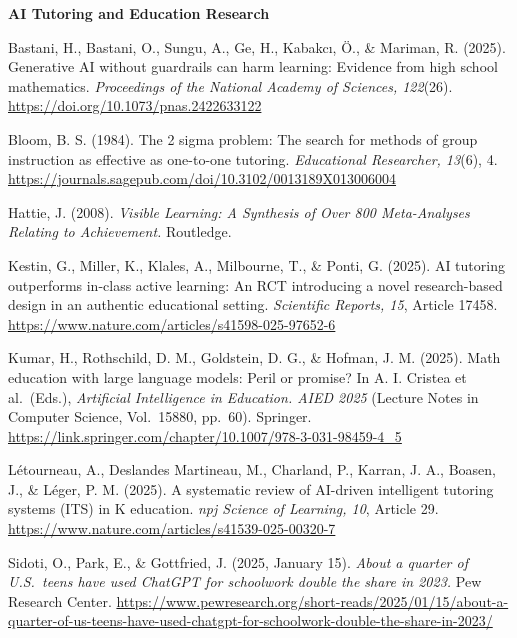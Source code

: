 \documentclass[11pt,letterpaper]{article}
\begin{document}
\vspace{0.3em}
{\sffamily\bfseries\small\color{accent}AI Tutoring and Education Research}\vspace{-0.2em}

\begin{list}{}{%
  \setlength{\leftmargin}{1.4em}
  \setlength{\itemindent}{-1.4em}
  \setlength{\itemsep}{0.35em}
  \setlength{\parsep}{0pt}
}

\item Bastani, H., Bastani, O., Sungu, A., Ge, H., Kabakc\i, \"O., \& Mariman, R.
(2025). Generative AI without guardrails can harm learning: Evidence from high
school mathematics. \textit{Proceedings of the National Academy of Sciences,
122}(26). \url{https://doi.org/10.1073/pnas.2422633122}

\item Bloom, B. S. (1984). The 2 sigma problem: The search for methods of group
instruction as effective as one-to-one tutoring. \textit{Educational Researcher,
13}(6), 4.
\url{https://journals.sagepub.com/doi/10.3102/0013189X013006004}

\item Hattie, J. (2008). \textit{Visible Learning: A Synthesis of Over 800
Meta-Analyses Relating to Achievement.} Routledge.

\item Kestin, G., Miller, K., Klales, A., Milbourne, T., \& Ponti, G. (2025).
AI tutoring outperforms in-class active learning: An RCT introducing a novel
research-based design in an authentic educational setting. \textit{Scientific
Reports, 15}, Article 17458.
\url{https://www.nature.com/articles/s41598-025-97652-6}

\item Kumar, H., Rothschild, D. M., Goldstein, D. G., \& Hofman, J. M. (2025).
Math education with large language models: Peril or promise? In A. I. Cristea
et al.\ (Eds.), \textit{Artificial Intelligence in Education. AIED 2025}
(Lecture Notes in Computer Science, Vol.\ 15880, pp.\ 60). Springer.
\url{https://link.springer.com/chapter/10.1007/978-3-031-98459-4_5}

\item L\'etourneau, A., Deslandes Martineau, M., Charland, P., Karran, J. A.,
Boasen, J., \& L\'eger, P. M. (2025). A systematic review of AI-driven
intelligent tutoring systems (ITS) in K education. \textit{npj
Science of Learning, 10}, Article 29.
\url{https://www.nature.com/articles/s41539-025-00320-7}

\item Sidoti, O., Park, E., \& Gottfried, J. (2025, January 15). \textit{About
a quarter of U.S.\ teens have used ChatGPT for schoolwork \textendash{} double
the share in 2023.} Pew Research Center.
\url{https://www.pewresearch.org/short-reads/2025/01/15/about-a-quarter-of-us-teens-have-used-chatgpt-for-schoolwork-double-the-share-in-2023/}

\end{list}
\end{document}
